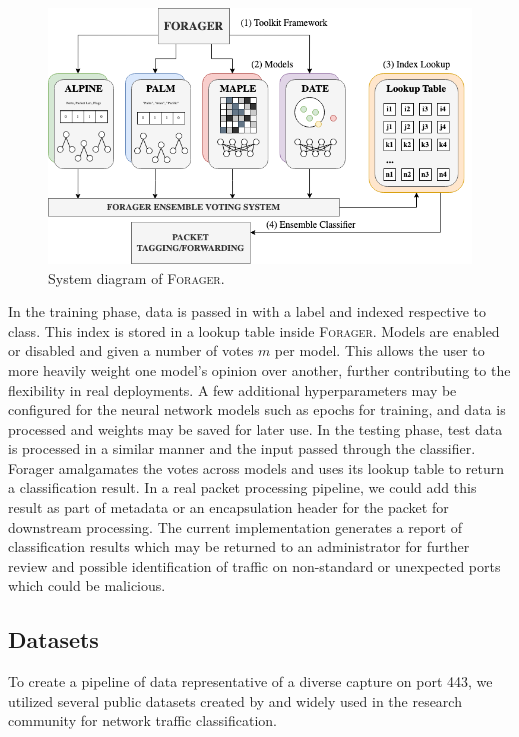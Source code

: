 \begin{figure} [ht!]
\centering
\includegraphics[scale=0.5]{chapters/7/img/forager.png}
\caption{System diagram of \textsc{Forager}.}
\label{fig:forager}
\end{figure}

In the training phase, data is passed in with a label and indexed respective to class. This index is stored in a lookup table inside \textsc{Forager}. Models are enabled or disabled and given a number of votes $m$ per model. This allows the user to more heavily weight one model's opinion over another, further contributing to the flexibility in real deployments. A few additional hyperparameters may be configured for the neural network models such as epochs for training, and data is processed and weights may be saved for later use. In the testing phase, test data is processed in a similar manner and the input passed through the classifier. Forager amalgamates the votes across models and uses its lookup table to return a classification result. In a real packet processing pipeline, we could add this result as part of metadata or an encapsulation header for the packet for downstream processing. The current implementation generates a report of classification results which may be returned to an administrator for further review and possible identification of traffic on non-standard or unexpected ports which could be malicious.

\subsection{Datasets}
To create a pipeline of data representative of a diverse capture on port 443, we utilized several public datasets created by and widely used in the research community for network traffic classification.

